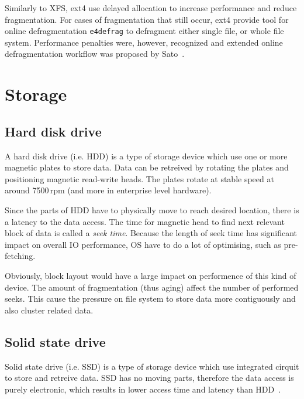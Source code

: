 \documentclass[
  color, %
  table, %
  lof,   %
  lot,   %
]{fithesis3}
\begin{document}
Similarly to XFS, ext4 use delayed allocation to increase performance and reduce fragmentation. For cases of fragmentation that still occur, ext4 provide tool for online defragmentation \texttt{e4defrag} to defragment either single file, or whole file system. Performance penalties were, however, recognized and extended online defragmentation workflow was proposed by Sato~\cite{sato2007:ext4}.




\section{Storage}
\subsection{Hard disk drive}
A hard disk drive (i.e. HDD) is a type of storage device which use one or more magnetic plates to store data. Data can be retreived by rotating the plates and positioning magnetic read-write heads. The plates rotate at stable speed at around 7500\,rpm (and more in enterprise level hardware).

Since the parts of HDD have to physically move to reach desired location, there is a latency to the data access. The time for magnetic head to find next relevant block of data is called a \emph{seek time}. Because the length of seek time has significant impact on overall IO performance, OS have to do a lot of optimising, such as pre-fetching.

Obviously, block layout would have a large impact on performence of this kind of device. The amount of fragmentation (thus aging) affect the number of performed seeks. This cause the pressure on file system to store data more contiguously and also cluster related data.

\subsection{Solid state drive}
Solid state drive (i.e. SSD) is  a type of storage device which use integrated cirquit to store and retreive data. SSD has no moving parts, therefore the data access is purely electronic, which results in lower access time and latency than HDD~\cite{kasavajhala2011solid}.
\end{document}
